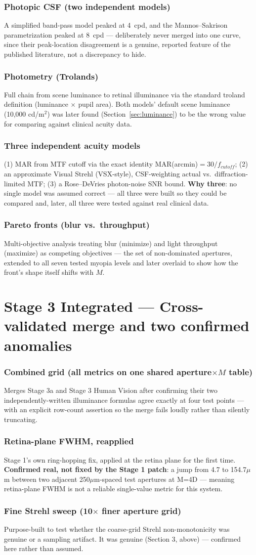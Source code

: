 \documentclass[10pt]{report}
\newcommand{\feat}[1]{\subsection*{#1}}
\begin{document}
\feat{Photopic CSF (two independent models)}
A simplified band-pass model peaked at 4~cpd, and the Mannos--Sakrison parametrization peaked at 8~cpd --- deliberately never merged into one curve, since their peak-location disagreement is a genuine, reported feature of the published literature, not a discrepancy to hide.

\feat{Photometry (Trolands)}
Full chain from scene luminance to retinal illuminance via the standard troland definition (luminance $\times$ pupil area). Both models' default scene luminance (10{,}000 cd/m$^2$) was later found (Section~\ref{sec:luminance}) to be the wrong value for comparing against clinical acuity data.

\feat{Three independent acuity models}
(1) MAR from MTF cutoff via the exact identity MAR(arcmin)$=30/f_{cutoff}$; (2) an approximate Visual Strehl (VSX-style), CSF-weighting actual vs.\ diffraction-limited MTF; (3) a Rose--DeVries photon-noise SNR bound. \textbf{Why three}: no single model was assumed correct --- all three were built so they could be compared and, later, all three were tested against real clinical data.

\feat{Pareto fronts (blur vs.\ throughput)}
Multi-objective analysis treating blur (minimize) and light throughput (maximize) as competing objectives --- the set of non-dominated apertures, extended to all seven tested myopia levels and later overlaid to show how the front's shape itself shifts with $M$.

\chapter{Stage 3 Integrated --- Cross-validated merge and two confirmed anomalies}
\feat{Combined grid (all metrics on one shared aperture$\times M$ table)}
Merges Stage 3a and Stage 3 Human Vision after confirming their two independently-written illuminance formulas agree exactly at four test points --- with an explicit row-count assertion so the merge fails loudly rather than silently truncating.

\feat{Retina-plane FWHM, reapplied}
Stage 1's own ring-hopping fix, applied at the retina plane for the first time. \textbf{Confirmed real, not fixed by the Stage 1 patch}: a jump from 4.7 to 154.7$\mu$m between two adjacent 250$\mu$m-spaced test apertures at M=4D --- meaning retina-plane FWHM is not a reliable single-value metric for this system.

\feat{Fine Strehl sweep (10$\times$ finer aperture grid)}
Purpose-built to test whether the coarse-grid Strehl non-monotonicity was genuine or a sampling artifact. It was genuine (Section 3, above) --- confirmed here rather than assumed.
\end{document}

